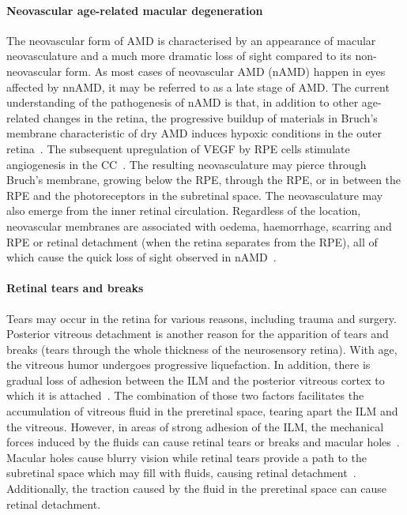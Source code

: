 \documentclass{article}
\begin{document}
\paragraph*{Neovascular age-related macular degeneration}
The neovascular form of AMD is characterised by an appearance of macular neovasculature and a much more dramatic loss of sight compared to its non-neovascular form.
As most cases of neovascular AMD (nAMD) happen in eyes affected by nnAMD, it may be referred to as a late stage of AMD.
The current understanding of the pathogenesis of nAMD is that, in addition to other age-related changes in the retina, the progressive buildup of materials in Bruch's membrane characteristic of dry AMD induces hypoxic conditions in the outer retina~\cite{Jager_2008,Newsom_2008}.
The subsequent upregulation of VEGF by RPE cells stimulate angiogenesis in the CC~\cite{Jager_2008}.
The resulting neovasculature may pierce through Bruch's membrane, growing below the RPE, through the RPE, or in between the RPE and the photoreceptors in the subretinal space.
The neovasculature may also emerge from the inner retinal circulation.
Regardless of the location, neovascular membranes are associated with oedema, haemorrhage, scarring and RPE or retinal detachment (when the retina separates from the RPE), all of which cause the quick loss of sight observed in nAMD~\cite{Gupta_2015,Jager_2008}.\\

\paragraph*{Retinal tears and breaks}
Tears may occur in the retina for various reasons, including trauma and surgery.
Posterior vitreous detachment is another reason for the apparition of tears and breaks (tears through the whole thickness of the neurosensory retina).
With age, the vitreous humor undergoes progressive liquefaction.
In addition, there is gradual loss of adhesion between the ILM and the posterior vitreous cortex to which it is attached~\cite{Bottos_2012,Medina_2016}.
The combination of those two factors facilitates the accumulation of vitreous fluid in the preretinal space, tearing apart the ILM and the vitreous.
However, in areas of strong adhesion of the ILM, the mechanical forces induced by the fluids can cause retinal tears or breaks and macular holes~\cite{Shechtman_2009}.
Macular holes cause blurry vision while retinal tears provide a path to the subretinal space which may fill with fluids, causing retinal detachment~\cite{Medina_2016}.
Additionally, the traction caused by the fluid in the preretinal space can cause retinal detachment.\\
\end{document}
